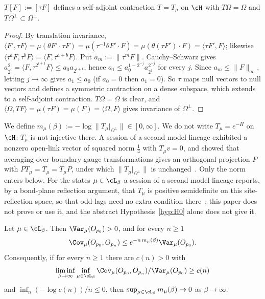 \begin{lemma}\label{pf:lem-transfer}
$T[F]:=[\tau F]$ defines a self-adjoint contraction $T=T_\mu$ on $\cH$ with $T\Omega=\Omega$ and $T\Omega^\perp\subset\Omega^\perp$.
\end{lemma}

\begin{proof}
By translation invariance, $\langle F',\tau F\rangle=\mu(\theta F'\cdot\tau F)=\mu(\tau^{-1}\theta F'\cdot F)=\mu(\theta(\tau F')\cdot F)=\langle\tau F',F\rangle$; likewise $\langle\tau^aF,\tau^bF\rangle=\langle F,\tau^{a+b}F\rangle$. Put $a_m:=\|\tau^mF\|$. Cauchy--Schwarz gives $a_{2^i}^2=\langle F,\tau^{2^{i+1}}F\rangle\le a_0a_{2^{i+1}}$, hence $a_1\le a_0^{1-2^{-j}}a_{2^j}^{2^{-j}}$ for every $j$. Since $a_m\le\|F\|_\infty$, letting $j\to\infty$ gives $a_1\le a_0$ (if $a_0=0$ then $a_1=0$). So $\tau$ maps null vectors to null vectors and defines a symmetric contraction on a dense subspace, which extends to a self-adjoint contraction. $T\Omega=\Omega$ is clear, and $\langle\Omega,TF\rangle=\mu(\tau F)=\mu(F)=\langle\Omega,F\rangle$ gives invariance of $\Omega^\perp$.
\end{proof}

We define $m_\mu(\beta):=-\log\|T_\mu|_{\Omega^\perp}\|\in[0,\infty]$. We do not write $T_\mu=e^{-H}$ on $\cH$: $T_\mu$ is not injective there. A session of a second model lineage exhibited a nonzero open-link vector of squared norm $\tfrac14$ with $T_\mu v=0$, and showed that averaging over boundary gauge transformations gives an orthogonal projection $P$ with $PT_\mu=T_\mu=T_\mu P$, under which $\|T_\mu|_{\Omega^\perp}\|$ is unchanged~\cite[comments 7105447358, 7104999220]{RepoThread}. Only the norm enters below. For the states $\mu\in\cL_\beta$ a session of a second model lineage reports, by a bond-plane reflection argument, that $T_\mu$ is positive semidefinite on this site-reflection space, so that odd lags need no extra condition there~\cite[comment 7105972084]{RepoThread}; this paper does not prove or use it, and the abstract Hypothesis~\ref{hyp:H0} alone does not give it.

\begin{proposition}\label{pf:prop-spectral}
Let $\mu\in\cL_\beta$. Then $\Var_\mu(O_{p_0})>0$, and for every $n\ge1$
\begin{equation}\label{pf:eq-S1}
\Cov_\mu(O_{p_0},O_{p_n})\le e^{-n\,m_\mu(\beta)}\Var_\mu(O_{p_0}).
\end{equation}
Consequently, if for every $n\ge1$ there are $c(n)>0$ with
\[\liminf_{\beta\to\infty}\inf_{\mu\in\cL_\beta}\Cov_\mu(O_{p_0},O_{p_n})/\Var_\mu(O_{p_0})\ge c(n)\]
and $\inf_n(-\log c(n))/n\le0$, then $\sup_{\mu\in\cL_\beta}m_\mu(\beta)\to0$ as $\beta\to\infty$.
\end{proposition}

